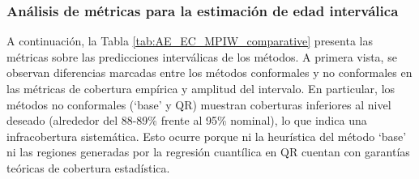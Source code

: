 \subsubsection{Análisis de métricas para la estimación de edad interválica}

A continuación, la Tabla \ref{tab:AE_EC_MPIW_comparative} presenta las métricas sobre las 
predicciones interválicas de los métodos. 
A primera vista, se observan diferencias marcadas entre los métodos conformales y no conformales en las 
métricas de cobertura empírica y amplitud del intervalo. En particular, los métodos no 
conformales (`base' y QR) muestran coberturas inferiores al nivel deseado (alrededor del 88-89\% frente al 
95\% nominal), lo que indica una infracobertura sistemática. 
Esto ocurre porque ni la heurística del método `base' ni las regiones generadas por la regresión cuantílica 
en QR cuentan con garantías teóricas de cobertura estadística.

